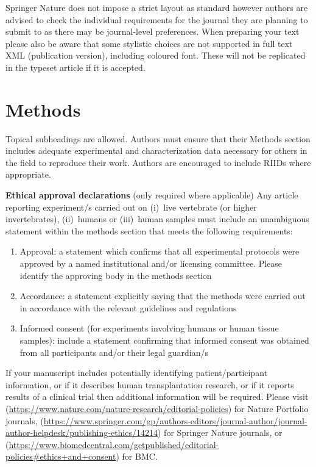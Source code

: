 \documentclass[pdflatex,sn-mathphys]{sn-jnl}%
\theoremstyle{thmstyleone}%
\theoremstyle{thmstyletwo}%
\theoremstyle{thmstylethree}%
\begin{document}
Springer Nature does not impose a strict layout as standard however authors are advised to check the individual requirements for the journal they are planning to submit to as there may be journal-level preferences.
When preparing your text please also be aware that some stylistic choices are not supported in full text XML (publication version), including coloured font.
These will not be replicated in the typeset article if it is accepted.



\section{Methods}
\label{sec:methods}

Topical subheadings are allowed.
Authors must ensure that their Methods section includes adequate experimental and characterization data necessary for others in the field to reproduce their work.
Authors are encouraged to include RIIDs where appropriate.

\textbf{Ethical approval declarations} (only required where applicable) Any article reporting experiment/s carried out on (i)~live vertebrate (or higher invertebrates), (ii)~humans or (iii)~human samples must include an unambiguous statement within the methods section that meets the following requirements: 

\begin{enumerate}[1.]
  \item Approval: a statement which confirms that all experimental protocols were approved by a named institutional and/or licensing committee.
  Please identify the approving body in the methods section

  \item Accordance: a statement explicitly saying that the methods were carried out in accordance with the relevant guidelines and regulations

  \item Informed consent (for experiments involving humans or human tissue samples): include a statement confirming that informed consent was obtained from all participants and/or their legal guardian/s
\end{enumerate}

If your manuscript includes potentially identifying patient/participant information, or if it describes human transplantation research, or if it reports results of a clinical trial then  additional information will be required.
Please visit (\url{https://www.nature.com/nature-research/editorial-policies}) for Nature Portfolio journals, (\url{https://www.springer.com/gp/authors-editors/journal-author/journal-author-helpdesk/publishing-ethics/14214}) for Springer Nature journals, or (\url{https://www.biomedcentral.com/getpublished/editorial-policies\#ethics+and+consent}) for BMC\@.
\end{document}
